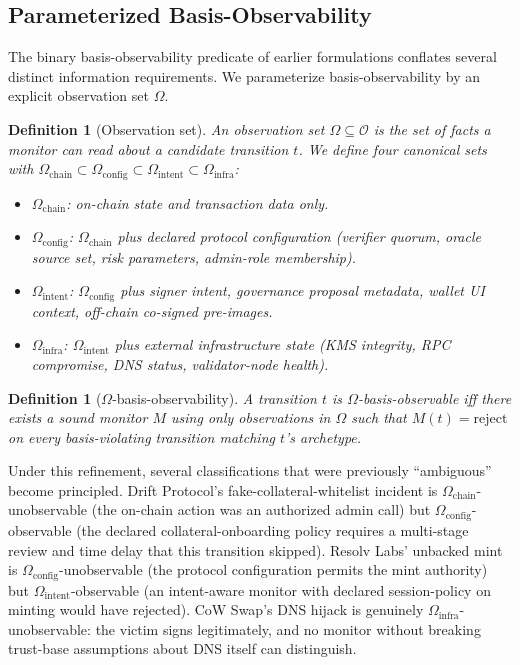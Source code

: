 \documentclass[11pt,a4paper]{article}
\newtheorem{definition}[theorem]{Definition}
\begin{document}
\subsection{Parameterized Basis-Observability}\label{sec:obs-sets}

The binary basis-observability predicate of earlier formulations conflates several distinct information requirements. We parameterize basis-observability by an explicit observation set $\Omega$.

\begin{definition}[Observation set]\label{def:omega}
An \emph{observation set} $\Omega \subseteq \mathcal{O}$ is the set of facts a monitor can read about a candidate transition $t$. We define four canonical sets with $\Omega_{\mathrm{chain}} \subset \Omega_{\mathrm{config}} \subset \Omega_{\mathrm{intent}} \subset \Omega_{\mathrm{infra}}$:
\begin{itemize}
  \item $\Omega_{\mathrm{chain}}$: on-chain state and transaction data only.
  \item $\Omega_{\mathrm{config}}$: $\Omega_{\mathrm{chain}}$ plus declared protocol configuration (verifier quorum, oracle source set, risk parameters, admin-role membership).
  \item $\Omega_{\mathrm{intent}}$: $\Omega_{\mathrm{config}}$ plus signer intent, governance proposal metadata, wallet UI context, off-chain co-signed pre-images.
  \item $\Omega_{\mathrm{infra}}$: $\Omega_{\mathrm{intent}}$ plus external infrastructure state (KMS integrity, RPC compromise, DNS status, validator-node health).
\end{itemize}
\end{definition}

\begin{definition}[$\Omega$-basis-observability]\label{def:omega-obs}
A transition $t$ is \emph{$\Omega$-basis-observable} iff there exists a sound monitor $M$ using only observations in $\Omega$ such that $M(t) = \mathrm{reject}$ on every basis-violating transition matching $t$'s archetype.
\end{definition}

Under this refinement, several classifications that were previously ``ambiguous'' become principled. Drift Protocol's fake-collateral-whitelist incident is $\Omega_{\mathrm{chain}}$-unobservable (the on-chain action was an authorized admin call) but $\Omega_{\mathrm{config}}$-observable (the declared collateral-onboarding policy requires a multi-stage review and time delay that this transition skipped). Resolv Labs' unbacked mint is $\Omega_{\mathrm{config}}$-unobservable (the protocol configuration permits the mint authority) but $\Omega_{\mathrm{intent}}$-observable (an intent-aware monitor with declared session-policy on minting would have rejected). CoW Swap's DNS hijack is genuinely $\Omega_{\mathrm{infra}}$-unobservable: the victim signs legitimately, and no monitor without breaking trust-base assumptions about DNS itself can distinguish.
\end{document}
